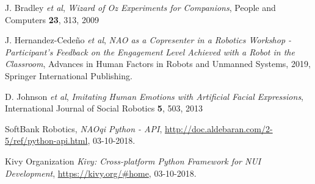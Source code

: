\documentclass{article}
\begin{document}
    \begin{thebibliography}{5}
    
         J. Bradley \textit{et al}, {\em Wizard of Oz Experiments for Companions}, People and Computers {\bf 23}, 313, 2009
        
         J. Hernandez-Cedeño \textit{et al}, {\em NAO as a Copresenter in a Robotics Workshop - Participant’s Feedback on the Engagement Level Achieved with a Robot in the Classroom}, Advances in Human Factors in Robots and Unmanned Systems, 2019, Springer International Publishing.
        
         D. Johnson \textit{et al}, {\em Imitating Human Emotions with Artificial Facial Expressions}, International Journal of Social Robotics {\bf 5}, 503, 2013
        
         SoftBank Robotics, {\em NAOqi Python - API},  \url{http://doc.aldebaran.com/2-5/ref/python-api.html}, 03-10-2018.
        
         Kivy Organization {\em Kivy: Cross-platform Python Framework for NUI Development}, \url{https://kivy.org/#home}, 03-10-2018.
        
    \end{thebibliography}
\end{document}
